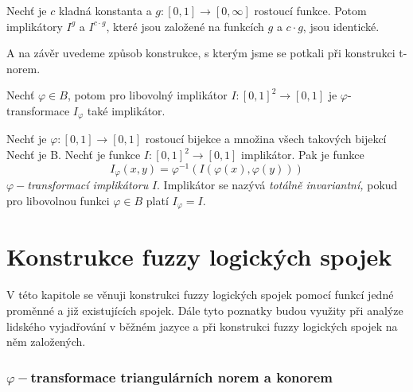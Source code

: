 \begin{sentence} \cite{habilitace}
    Nech\v t je $c$ kladn\'a konstanta a $g:[0,1] \to [0,\infty]$
    rostoucí  funkce. Potom implik\'atory $I^g$ a $I^{c \cdot g}$,
    které jsou zalo\v zen\'e na  funkcích $g$ a $c \cdot g$, jsou
    identick\'e.
\end{sentence}
A na z\'av\v er uvedeme zp\r usob konstrukce, s kter\'ym jsme se potkali p\v ri konstrukci t-norem.

\begin{sentence}\cite{Springer}
    Nech\v t $\varphi \in B$, potom pro libovolný implikátor $I: [0,1]^2 \rightarrow [0,1]$ je $\varphi$-transformace $I_\varphi$ také implikátor.
\end{sentence}

\begin{definition}\cite{Springer}
    Nech\v t je $\varphi:[0,1] \rightarrow [0,1]$  rostoucí
    bijekce a množina všech takových bijekcí Nech\v t je B. Nech\v t je funkce
    $I:[0,1]^2\rightarrow [0,1]$ 
    implikátor.
    Pak je funkce
    $$I_\varphi(x,y)=\varphi^{-1}(I(\varphi (x), \varphi (y)))$$
    $\varphi-${\em transformací implikátoru} $I.$ Implikátor se nazývá
    {\em totálně invariantní,} pokud pro libovolnou funkci $\varphi \in B$ platí $I_\varphi=I.$\\
\end{definition}

\chapter{Konstrukce fuzzy logick\'ych spojek}

V této kapitole se věnuji konstrukci fuzzy logických spojek pomocí funkcí jedné proměnné a již existujících spojek. Dále tyto poznatky budou využity při analýze lidského vyjadřování v běžném jazyce a při konstrukci fuzzy logických spojek na něm založených.

\subsection{$\varphi-$transformace triangulárních norem a konorem}

